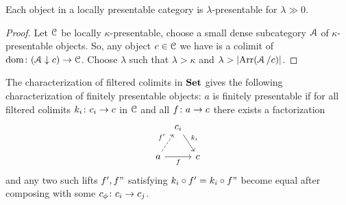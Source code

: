 \documentclass[a4paper,11pt,oneside,openany]{scrbook}
\begin{document}
\begin{prop}
	Each object in a locally presentable category is $ \lambda $-presentable
	for $ \lambda \gg 0 $.
\end{prop}
\begin{proof}
	Let $ \operatorname{\mathcal{C}} $ be locally $\kappa $-presentable, choose a small dense subcategory $\operatorname{\mathcal{A}} $ of $ \kappa $-presentable objects.
	So, any object $ c \in \operatorname{\mathcal{C}} $ we have is a colimit of $\operatorname{dom}\colon (\operatorname{\mathcal{A}}\downarrow c)\rightarrow\operatorname{\mathcal{C}}$.
	Choose $ \lambda $ such that $ \lambda > \kappa $ and $ \lambda > \left\lvert \operatorname{Arr}(\operatorname{\mathcal{A}}/c) \right\rvert $.
\end{proof}
The characterization of filtered colimits in $ {\normalfont\textbf{Set}} $ gives the following characterization of finitely presentable objects:
$ a $ is finitely presentable if for all filtered colimits $ k_i \colon c_i \to c $ in $ \operatorname{\mathcal{C}} $ and all $ f\colon a \to c $ there exists a factorization
\begin{displaymath}
	\begin{tikzcd}[column sep=tiny]
		& c_i \arrow[dr, "k_i"]&\\
		a \arrow[ur, dashed, "f'"]\arrow[rr, "f"']&& c
	\end{tikzcd}
\end{displaymath}
and any two such lifts $ f', f"  $ satisfying $ k_i \circ f' = k_i \circ f" $ become equal after composing with some $ c_\phi \colon c_i \to c_j $.
\end{document}
